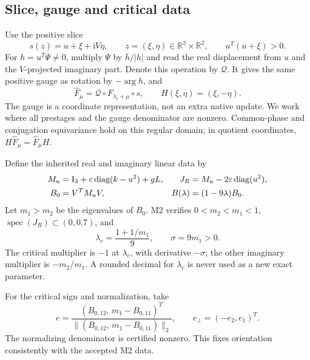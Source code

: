 \documentclass[11pt,a4paper]{article}
\numberwithin{equation}{section}
\newcommand{\R}{\mathbb R}\newcommand{\C}{\mathbb C}
\newcommand{\Fh}{\widehat F}\newcommand{\eps}{\varepsilon}
\newcommand{\iu}{\mathrm i}\newcommand{\one}{\mathbf 1}
\newcommand{\diag}{\operatorname{diag}}\newcommand{\Argz}{\operatorname{Arg}_0}
\begin{document}
\subsection{Slice, gauge and critical data}\label{sec:quotient}
Use the positive slice
\begin{equation}
s(z)=u+\xi+\iu V\eta,\qquad
z=(\xi,\eta)\in\R^3\times\R^2,\qquad u^T(u+\xi)>0.\label{eq:slice}
\end{equation}
For $h=u^T\Psi\ne0$, multiply $\Psi$ by $\overline h/|h|$ and read the real displacement from $u$ and the $V$-projected imaginary part. Denote this operation by $\mathcal Q$. It gives the same positive gauge as rotation by $-\arg h$, and
\begin{equation}
\Fh_\mu=\mathcal Q\circ F_{\lambda_c+\mu}\circ s,
\qquad H(\xi,\eta)=(\xi,-\eta).\label{eq:quotient}
\end{equation}
The gauge is a coordinate representation, not an extra native update. We work where all prestages and the gauge denominator are nonzero. Common-phase and conjugation equivariance hold on this regular domain; in quotient coordinates, $H\Fh_\mu=\Fh_\mu H$.

Define the inherited real and imaginary linear data by
\begin{align}
M_u&=\Id_3+\eps\diag(k-u^2)+gL,
 &J_R&=M_u-2\eps\diag(u^2),\label{eq:linear}\\
B_0&=V^TM_uV,
 &B(\lambda)&=(1-9\lambda)B_0.\label{eq:compression}
\end{align}
Let $m_1>m_2$ be the eigenvalues of $B_0$. M2 verifies $0<m_2<m_1<1$, $\operatorname{spec}(J_R)\subset(0,0.7)$, and
\begin{equation}
\lambda_c=\frac{1+1/m_1}{9},\qquad \sigma=9m_1>0.
\label{eq:critical}
\end{equation}
The critical multiplier is $-1$ at $\lambda_c$, with derivative $-\sigma$; the other imaginary multiplier is $-m_2/m_1$. A rounded decimal for $\lambda_c$ is never used as a new exact parameter.

For the critical sign and normalization, take
\begin{equation}
e=\frac{(B_{0,12},\,m_1-B_{0,11})^T}
 {\|(B_{0,12},\,m_1-B_{0,11})\|_2},
\qquad e_\perp=(-e_2,e_1)^T.\label{eq:critical-vector}
\end{equation}
The normalizing denominator is certified nonzero. This fixes orientation consistently with the accepted M2 data.
\end{document}
